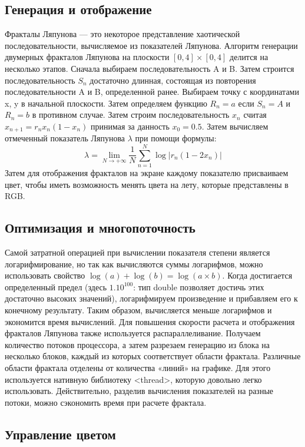 \documentclass[a5paper,10pt, twoside]{article} %
\begin{document}
  \subsection{Генерация и отображение}

	Фракталы Ляпунова — это некоторое представление хаотической последовательности, вычисляемое из показателей Ляпунова.
	Алгоритм генерации двумерных фракталов Ляпунова на плоскости $[0,4] \times [0,4]$ делится на несколько этапов.
	Сначала выбираем последовательность A и B.
	Затем строится последовательность $S_n$ достаточно длинная, состоящая из повторения последовательности A и B, определенной ранее.
	Выбираем точку с координатами x, y в начальной плоскости.
	Затем определяем функцию $R_n = a$ если $ S_n = A $ и $R_n = b$ в противном случае.
	Затем строим последовательность $x_n$ считая $x_{{n+1}}=r_{n}x_{n}(1-x_{n})$ принимая за данность $x_0 = 0.5$.
	Затем вычисляем отмеченный показатель Ляпунова $\lambda$ при помощи формулы:
	\[\lambda = \lim_{N \to +\infty} \frac{1}{N} \sum_{n=1}^{N} \log | r_n(1-2x_n) |\]
	Затем для отображения фракталов на экране каждому показателю присваиваем цвет, чтобы иметь возможность 
  менять цвета на лету, которые представлены в RGB.

  \subsection{Оптимизация и многопоточность}

	Самой затратной операцией при вычислении показателя степени является логарифмирование, но так как вычисляются суммы логарифмов, 
  можно использовать свойство $\log(a) + \log(b) = \log(a \times b)$.
	Когда достигается определенный предел (здесь $1.10^{100}$: тип double позволяет достичь этих достаточно высоких значений), 
  логарифмируем произведение и прибавляем его к конечному результату.
  Таким образом, вычисляется меньше логарифмов и экономится время вычислений.
  Для повышения скорости расчета и отображения фракталов Ляпунова также используется распараллеливание.
  Получаем количество потоков процессора, а затем разрезаем генерацию из блока на 
  несколько блоков, каждый из которых соответствует области фрактала.
  Различные области фрактала отделены от количества «линий» на графике.
  Для этого используется нативную библиотеку <thread>, которую довольно легко использовать.
  Действительно, разделив вычисления показателей на разные потоки, можно сэкономить время при расчете фрактала.

  \subsection{Управление цветом}
\end{document}
